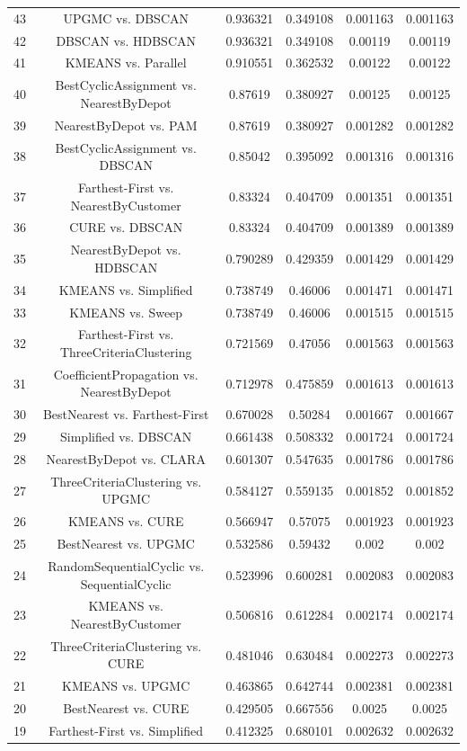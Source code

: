 \documentclass[a4paper,10pt]{article}
\begin{document}
\begin{landscape}
\begin{table}[!htp]
\begin{tabular}{cccccc}
43&UPGMC vs. DBSCAN&0.936321&0.349108&0.001163&0.001163\\
42&DBSCAN vs. HDBSCAN&0.936321&0.349108&0.00119&0.00119\\
41&KMEANS vs. Parallel&0.910551&0.362532&0.00122&0.00122\\
40&BestCyclicAssignment vs. NearestByDepot&0.87619&0.380927&0.00125&0.00125\\
39&NearestByDepot vs. PAM&0.87619&0.380927&0.001282&0.001282\\
38&BestCyclicAssignment vs. DBSCAN&0.85042&0.395092&0.001316&0.001316\\
37&Farthest-First vs. NearestByCustomer&0.83324&0.404709&0.001351&0.001351\\
36&CURE vs. DBSCAN&0.83324&0.404709&0.001389&0.001389\\
35&NearestByDepot vs. HDBSCAN&0.790289&0.429359&0.001429&0.001429\\
34&KMEANS vs. Simplified&0.738749&0.46006&0.001471&0.001471\\
33&KMEANS vs. Sweep&0.738749&0.46006&0.001515&0.001515\\
32&Farthest-First vs. ThreeCriteriaClustering&0.721569&0.47056&0.001563&0.001563\\
31&CoefficientPropagation vs. NearestByDepot&0.712978&0.475859&0.001613&0.001613\\
30&BestNearest vs. Farthest-First&0.670028&0.50284&0.001667&0.001667\\
29&Simplified vs. DBSCAN&0.661438&0.508332&0.001724&0.001724\\
28&NearestByDepot vs. CLARA&0.601307&0.547635&0.001786&0.001786\\
27&ThreeCriteriaClustering vs. UPGMC&0.584127&0.559135&0.001852&0.001852\\
26&KMEANS vs. CURE&0.566947&0.57075&0.001923&0.001923\\
25&BestNearest vs. UPGMC&0.532586&0.59432&0.002&0.002\\
24&RandomSequentialCyclic vs. SequentialCyclic&0.523996&0.600281&0.002083&0.002083\\
23&KMEANS vs. NearestByCustomer&0.506816&0.612284&0.002174&0.002174\\
22&ThreeCriteriaClustering vs. CURE&0.481046&0.630484&0.002273&0.002273\\
21&KMEANS vs. UPGMC&0.463865&0.642744&0.002381&0.002381\\
20&BestNearest vs. CURE&0.429505&0.667556&0.0025&0.0025\\
19&Farthest-First vs. Simplified&0.412325&0.680101&0.002632&0.002632\\

\end{tabular}
\end{table}
\end{landscape}
\end{document}

